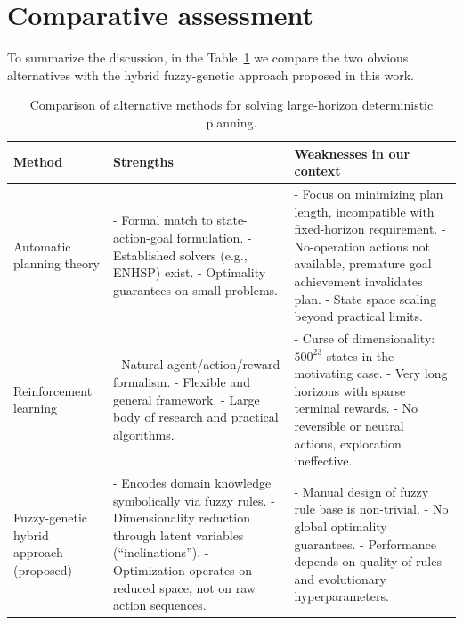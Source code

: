\documentclass[12pt, a4paper]{report}
\begin{document}
	\section{Comparative assessment}

To summarize the discussion, in the Table~\ref{table::comparison} we compare the two obvious alternatives with the hybrid fuzzy-genetic approach proposed in this work.

\begin{table}[H]
	\label{table::comparison}
	\centering
	\begin{tabular}{|p{3cm}|p{5cm}|p{6cm}|}
		\hline
		\textbf{Method} & \textbf{Strengths} & \textbf{Weaknesses in our context} \\ \hline
		Automatic planning theory & - Formal match to state-action-goal formulation. \newline - Established solvers (e.g., ENHSP) exist. \newline - Optimality guarantees on small problems. & - Focus on minimizing plan length, incompatible with fixed-horizon requirement. \newline - No-operation actions not available, premature goal achievement invalidates plan. \newline - State space scaling beyond practical limits. \\ \hline
		
		Reinforcement learning & - Natural agent/action/reward formalism. \newline - Flexible and general framework. \newline - Large body of research and practical algorithms. & - Curse of dimensionality: \(500^{23}\) states in the motivating case. \newline - Very long horizons with sparse terminal rewards. \newline - No reversible or neutral actions, exploration ineffective. \\ \hline
		
		Fuzzy-genetic hybrid approach (proposed) & - Encodes domain knowledge symbolically via fuzzy rules. \newline - Dimensionality reduction through latent variables (“inclinations”). \newline - Optimization operates on reduced space, not on raw action sequences. & - Manual design of fuzzy rule base is non-trivial. \newline - No global optimality guarantees. \newline - Performance depends on quality of rules and evolutionary hyperparameters. \\ \hline
	\end{tabular}
	\caption{Comparison of alternative methods for solving large-horizon deterministic planning.}
\end{table}
\end{document}
